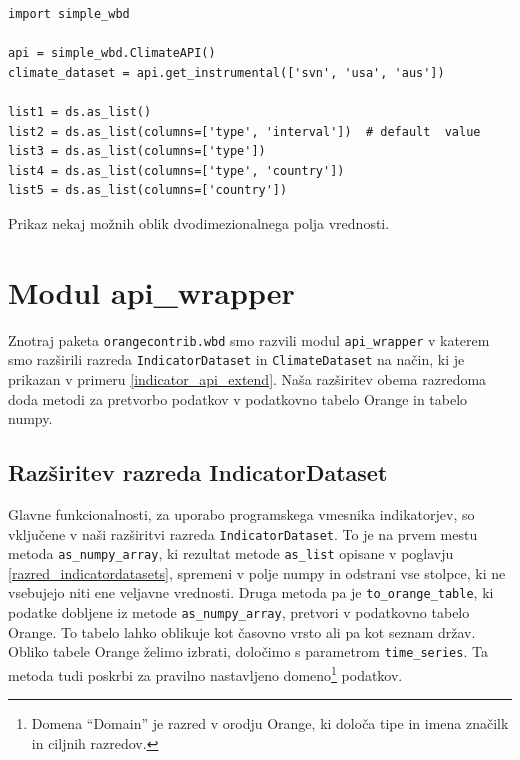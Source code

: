 \begin{snippet}
\begin{center}
\begin{lstlisting}
import simple_wbd

api = simple_wbd.ClimateAPI()                   
climate_dataset = api.get_instrumental(['svn', 'usa', 'aus'])

list1 = ds.as_list()
list2 = ds.as_list(columns=['type', 'interval'])  # default  value
list3 = ds.as_list(columns=['type'])
list4 = ds.as_list(columns=['type', 'country']) 
list5 = ds.as_list(columns=['country'])
\end{lstlisting}
\end{center}
\cprotect
\caption{Prikaz nekaj možnih oblik dvodimezionalnega polja vrednosti.} 
\label{list_configurations}
\end{snippet} 



\section{Modul api\_wrapper}


Znotraj paketa \verb|orangecontrib.wbd| smo razvili modul \verb|api_wrapper| v
katerem smo razširili razreda \verb|IndicatorDataset| in \verb|ClimateDataset|
na način, ki je prikazan v primeru \ref{indicator_api_extend}. Naša
razširitev obema razredoma doda metodi za pretvorbo podatkov v podatkovno 
tabelo Orange in tabelo numpy.

\subsection{Razširitev razreda IndicatorDataset}

Glavne funkcionalnosti, za uporabo programskega vmesnika indikatorjev, so
vključene v naši razširitvi razreda \verb|IndicatorDataset|. To je na prvem
mestu metoda \verb|as_numpy_array|, ki rezultat metode \verb|as_list|
opisane v poglavju \ref{razred_indicatordatasets}, spremeni v polje numpy in odstrani vse
stolpce, ki ne vsebujejo niti ene veljavne vrednosti. Druga metoda pa je
\verb|to_orange_table|, ki podatke dobljene iz metode \verb|as_numpy_array|,
pretvori v podatkovno tabelo Orange. To tabelo lahko oblikuje kot časovno
vrsto ali pa kot seznam držav. %
Obliko tabele Orange želimo izbrati,
določimo s parametrom \verb|time_series|. %
Ta metoda tudi poskrbi za pravilno nastavljeno domeno\footnote{Domena
``Domain'' je razred v orodju Orange, ki določa tipe in imena značilk in
ciljnih razredov.} podatkov.


